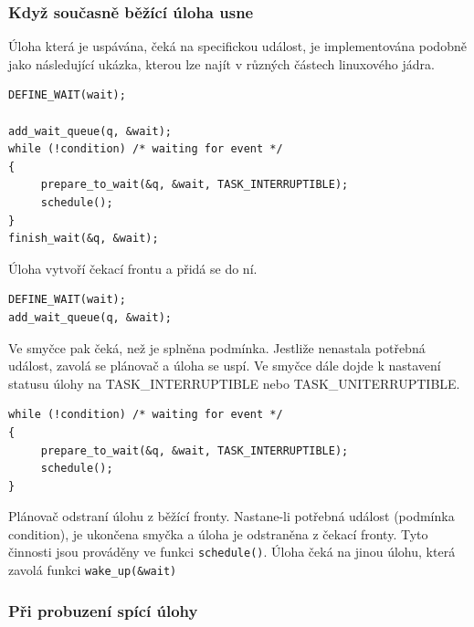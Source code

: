 \documentclass[a4paper,12pt]{article}
\begin{document}
%
\subsubsection{Když současně běžící úloha usne}

Úloha která je uspávána, čeká na specifickou událost, je implementována podobně jako následující ukázka, kterou lze najít v různých částech linuxového jádra.

\begin{verbatim} 
DEFINE_WAIT(wait); 

add_wait_queue(q, &wait); 
while (!condition) /* waiting for event */
{ 
     prepare_to_wait(&q, &wait, TASK_INTERRUPTIBLE); 
     schedule(); 
} 
finish_wait(&q, &wait);
\end{verbatim}
\pagebreak 
Úloha vytvoří čekací frontu a přidá se do ní. 
\nopagebreak
\begin{verbatim}
DEFINE_WAIT(wait);
add_wait_queue(q, &wait);
\end{verbatim}
Ve smyčce pak čeká, než je splněna podmínka. Jestliže nenastala potřebná událost, zavolá se plánovač a úloha se uspí. Ve smyčce dále dojde k nastavení statusu úlohy na TASK\_INTERRUPTIBLE nebo TASK\_UNITERRUPTIBLE.  
\begin{verbatim}
while (!condition) /* waiting for event */
{ 
     prepare_to_wait(&q, &wait, TASK_INTERRUPTIBLE); 
     schedule(); 
} 
\end{verbatim}

Plánovač odstraní úlohu z běžící fronty. Nastane-li potřebná událost \linebreak (podmínka condition), je ukončena smyčka a úloha je odstraněna z čekací fronty. Tyto činnosti jsou prováděny ve funkci \verb#schedule()#.
Úloha čeká na jinou úlohu, která zavolá funkci \verb#wake_up(&wait)#

\subsubsection{Při probuzení spící úlohy}

\end{document}
